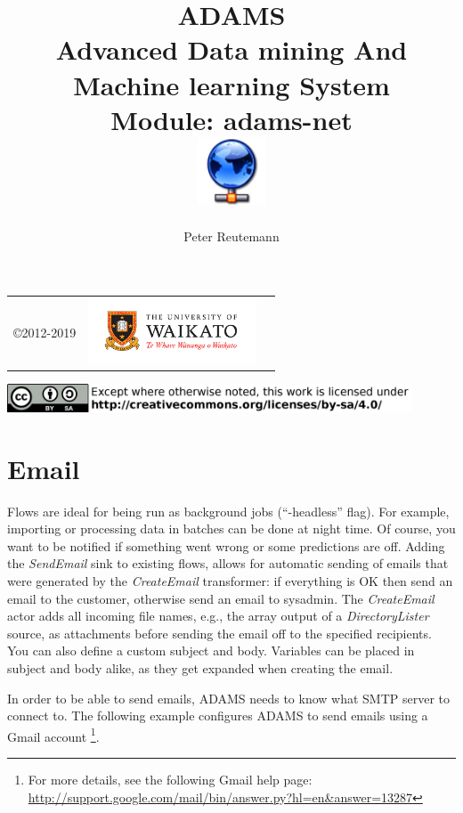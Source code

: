 \documentclass[a4paper]{book}
\title{
  \textbf{ADAMS} \\
  {\Large \textbf{A}dvanced \textbf{D}ata mining \textbf{A}nd \textbf{M}achine
  learning \textbf{S}ystem} \\
  {\Large Module: adams-net} \\
  \vspace{1cm}
  \includegraphics[width=2cm]{images/net-module.png} \\
}
\author{
  Peter Reutemann
}
\begin{document}
\begin{titlepage}
\maketitle

\thispagestyle{empty}
\center
\begin{table}[b]
	\begin{tabular}{c l l}
		\parbox[c][2cm]{2cm}{\copyright 2012-2019} &
		\parbox[c][2cm]{5cm}{\includegraphics[width=5cm]{images/coat_of_arms.pdf}} \\
	\end{tabular}
	\includegraphics[width=12cm]{images/cc.png} \\
\end{table}

\end{titlepage}

\tableofcontents
\listoffigures


\chapter{Email}
Flows are ideal for being run as background jobs (``-headless'' flag). For
example, importing or processing data in batches can be done at night time. 
Of course, you want to be notified if something went wrong or some predictions
are off. Adding the \textit{SendEmail} sink to existing flows, allows for automatic
sending of emails that were generated by the \textit{CreateEmail} transformer: 
if everything is OK then send an email to the customer,
otherwise send an email to sysadmin. The \textit{CreateEmail} actor adds all incoming
file names, e.g., the array output of a \textit{DirectoryLister} source, as
attachments before sending the email off to the specified recipients. You can
also define a custom subject and body. Variables can be placed in subject and
body alike, as they get expanded when creating the email.

In order to be able to send emails, ADAMS needs to know what SMTP server to
connect to. The following example configures ADAMS to send emails using a Gmail
account \footnote{For more details, see the following Gmail help page: \\
\url{http://support.google.com/mail/bin/answer.py?hl=en&answer=13287}{}}. 
\end{document}
